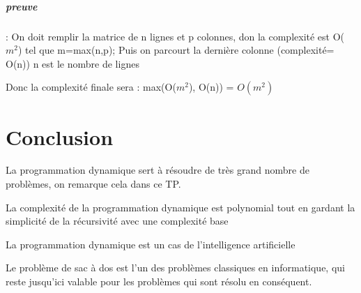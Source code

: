 \documentclass[12pt]{report}
\begin{document}
	\paragraph*{preuve}:
	On doit remplir la matrice de n lignes et p colonnes, don la complexité est O($m^{2}$) tel que m=max(n,p); 	Puis on parcourt la dernière colonne (complexité= O(n)) n est le nombre de lignes
	\par{}
	Donc la complexité finale sera : max(O($m^{2}$), O(n)) = $O(m^{2})$
	\chapter{Conclusion}
	\par{} 
	La programmation dynamique sert à résoudre de très grand nombre de problèmes, on remarque cela dans ce TP.
\par{}	
	La complexité de la programmation dynamique est polynomial tout en gardant la simplicité de la récursivité avec une complexité base
	\par{}
	La programmation dynamique est un cas de l'intelligence artificielle 
	\par{}
	Le problème de sac à dos est l'un des problèmes classiques en informatique, qui reste jusqu'ici valable pour les problèmes qui sont résolu en conséquent.
\end{document}
